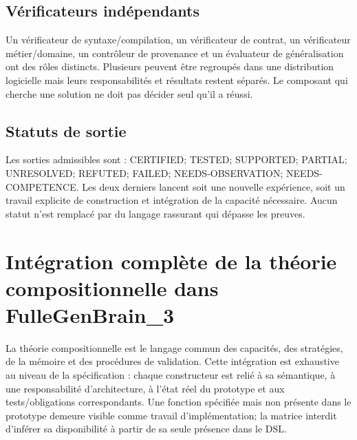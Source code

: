\documentclass[11pt,a4paper]{article}
\newcommand{\State}[1]{\textsf{#1}}
\begin{document}
\subsection{Vérificateurs indépendants}
Un vérificateur de syntaxe/compilation, un vérificateur de contrat, un vérificateur métier/domaine, un contrôleur de provenance et un évaluateur de généralisation ont des rôles distincts. Plusieurs peuvent être regroupés dans une distribution logicielle mais leurs responsabilités et résultats restent séparés. Le composant qui cherche une solution ne doit pas décider seul qu'il a réussi.

\subsection{Statuts de sortie}
Les sorties admissibles sont : \State{CERTIFIED}; \State{TESTED}; \State{SUPPORTED}; \State{PARTIAL}; \State{UNRESOLVED}; \State{REFUTED}; \State{FAILED}; \State{NEEDS-OBSERVATION}; \State{NEEDS-COMPETENCE}. Les deux derniers lancent soit une nouvelle expérience, soit un travail explicite de construction et intégration de la capacité nécessaire. Aucun statut n'est remplacé par du langage rassurant qui dépasse les preuves.

\section{Intégration complète de la théorie compositionnelle dans FulleGenBrain\_3}
La théorie compositionnelle est le langage commun des capacités, des stratégies, de la mémoire et des procédures de validation. Cette intégration est exhaustive au niveau de la spécification : chaque constructeur est relié à sa sémantique, à une responsabilité d'architecture, à l'état réel du prototype et aux tests/obligations correspondants. Une fonction spécifiée mais non présente dans le prototype demeure visible comme travail d'implémentation; la matrice interdit d'inférer sa disponibilité à partir de sa seule présence dans le DSL.
\end{document}
